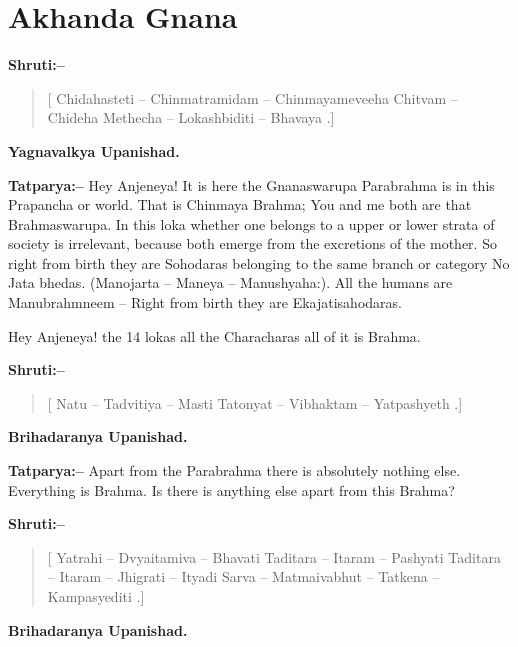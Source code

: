 \chapter{Akhanda Gnana}

\textbf{Shruti:–}

\begin{verse}
[ Chidahasteti – Chinmatramidam – Chinmayameveeha  Chitvam – Chideha Methecha – Lokashbiditi – Bhavaya .]
\end{verse}

\begin{flushright}
\textbf{Yagnavalkya Upanishad.}
\end{flushright}

\textbf{Tatparya:–} Hey Anjeneya! It is here the Gnanaswarupa Parabrahma is in this Prapancha or world. That is Chinmaya Brahma; You and me both are that Brahmaswarupa. In this loka whether one belongs to a upper or lower strata of society is irrelevant, because both emerge from the excretions of the mother. So right from birth they are Sohodaras belonging to the same branch or category No Jata bhedas. (Manojarta – Maneya – Manushyaha:). All the humans are Manubrahmneem – Right from birth they are Ekajatisahodaras.

Hey Anjeneya! the 14 lokas all the Characharas all of it is Brahma.

\textbf{Shruti:–}

\begin{verse}
[ Natu – Tadvitiya – Masti  Tatonyat – Vibhaktam – Yatpashyeth .]
\end{verse}

\begin{flushright}
\textbf{Brihadaranya Upanishad.}
\end{flushright}

\textbf{Tatparya:–} Apart from the Parabrahma there is absolutely nothing else. Everything is Brahma. Is there is anything else apart from this Brahma?

\textbf{Shruti:–}

\begin{verse}
[ Yatrahi – Dvyaitamiva – Bhavati  Taditara – Itaram – Pashyati  Taditara – Itaram – Jhigrati – Ityadi  Sarva – Matmaivabhut – Tatkena – Kampasyediti .]
\end{verse}

\begin{flushright}
\textbf{Brihadaranya Upanishad.}
\end{flushright}

